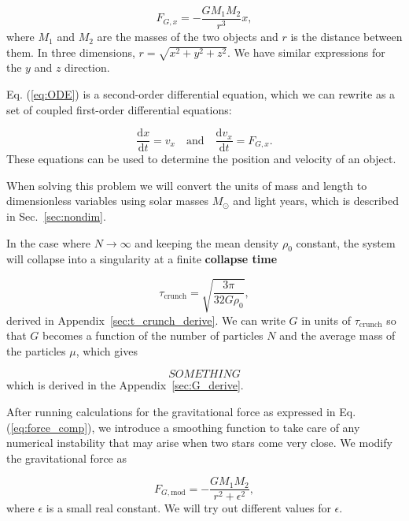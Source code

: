 \documentclass{article}
\begin{document}
\begin{multicols}{2}
\begin{equation}\label{eq:force_comp}
	F_{G,x} = - \frac{G M_1 M_2}{r^3}x,
\end{equation}
where $M_1$ and $M_2$ are the masses of the two objects and $r$ is the distance between them. In three dimensions, $r = \sqrt{x^2 + y^2 + z^2}$. We have similar expressions for the $y$ and $z$ direction.

Eq. (\ref{eq:ODE}) is a second-order differential equation, which we can rewrite as a set of coupled first-order differential equations:

\begin{equation}
	\frac{\mathrm{d}x}{\mathrm{d}t} = v_x  \quad \mathrm{and} \quad \frac{\mathrm{d}v_x}{\mathrm{d}t} = F_{G,x}.
\end{equation}
These equations can be used to determine the position and velocity of an object.

When solving this problem we will convert the units of mass and length to dimensionless variables using solar masses $M_{\odot}$ and light years, which is described in Sec.~\ref{sec:nondim}.

In the case where $N \rightarrow \infty$ and keeping the mean density $\rho_0$ constant, the system will collapse into a singularity at a finite \textbf{collapse time} 

\begin{equation}\label{eq:t_crunch}
\tau_{\mathrm{crunch}} = \sqrt{\frac{3 \pi}{32G\rho_0}},
\end{equation} 
derived in Appendix~\ref{sec:t_crunch_derive}. We can write $G$ in units of $\tau_{\mathrm{crunch}}$ so that $G$ becomes a function of the number of particles $N$ and the average mass of the particles $\mu$, which gives

\begin{equation}
	SOMETHING
\end{equation}
which is derived in the Appendix~\ref{sec:G_derive}.

After running calculations for the gravitational force as expressed in Eq. (\ref{eq:force_comp}), we introduce a smoothing function to take care of any numerical instability that may arise when two stars come very close. We modify the gravitational force as

\begin{equation}\label{eq:force_mod}
	F_{G,\mathrm{mod}} = - \frac{G M_1 M_2}{r^2 + \epsilon^2},
\end{equation}
where $\epsilon$ is a small real constant. We will try out different values for $\epsilon$.


\end{multicols}
\end{document}
